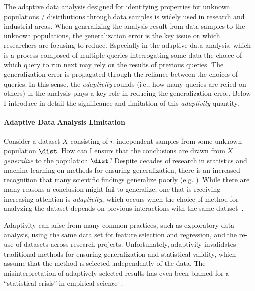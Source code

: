 The adaptive data analysis designed for identifying  properties for unknown populations / distributions 
through data samples is widely 
used in research and industrial areas.
When generalizing the analysis result from data samples to the unknown populations, 
the generalization error is the key issue on which researchers are focusing to reduce.
Especially in the adaptive data analysis,
which is a process composed of 
multiple queries interrogating some data
the choice of which query to run next may rely on the results of previous queries. 
The generalization error is propagated through the reliance between the choices of queries.
In this sense, the \emph{adaptivity} rounds (i.e., how many queries are relied on others) in the analysis plays a key role in reducing the generalization error.
Below I introduce in detail the significance and limitation of this \emph{adaptivity} quantity.
\paragraph{Adaptive Data Analysis Limitation}
\label{sec:intro-exelimitation}
Consider a dataset $X$ consisting of $n$ independent samples from some unknown population $\dist$. How can I ensure that the conclusions are drawn from $X$ \emph{generalize} to the population $\dist$? Despite decades of research in statistics and machine learning on methods for ensuring generalization, there is an increased recognition that many scientific findings generalize poorly (e.g. 
\cite{Ioannidis05,GelmanL13}
). While there are many reasons a conclusion might fail to generalize, one that is receiving increasing attention is \emph{adaptivity}, which occurs when the choice of method for analyzing the dataset depends on previous interactions with the same dataset~\cite{GelmanL13}.

 Adaptivity can arise from many common practices, such as exploratory data analysis, using the same data set for feature selection and regression, and the re-use of datasets across research projects. Unfortunately, adaptivity invalidates traditional methods for ensuring generalization and statistical validity, which assume that the method is selected independently of the data. The misinterpretation of adaptively selected results has even been blamed for a ``statistical crisis'' in empirical science~\cite{GelmanL13}.

